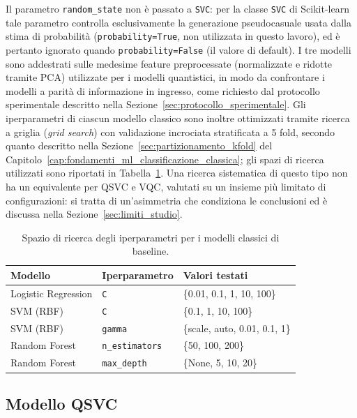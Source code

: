 

Il parametro \texttt{random\_state} non è passato a \texttt{SVC}: per la classe \texttt{SVC} di Scikit-learn tale parametro controlla esclusivamente la generazione pseudocasuale usata dalla stima di probabilità (\texttt{probability=True}, non utilizzata in questo lavoro), ed è pertanto ignorato quando \texttt{probability=False} (il valore di default). I tre modelli sono addestrati sulle medesime feature preprocessate (normalizzate e ridotte tramite PCA) utilizzate per i modelli quantistici, in modo da confrontare i modelli a parità di informazione in ingresso, come richiesto dal protocollo sperimentale descritto nella Sezione~\ref{sec:protocollo_sperimentale}. Gli iperparametri di ciascun modello classico sono inoltre ottimizzati tramite ricerca a griglia (\textit{grid search}) con validazione incrociata stratificata a 5 fold, secondo quanto descritto nella Sezione~\ref{sec:partizionamento_kfold} del Capitolo~\ref{cap:fondamenti_ml_classificazione_classica}; gli spazi di ricerca utilizzati sono riportati in Tabella~\ref{tab:grid_search_classici}. Una ricerca sistematica di questo tipo non ha un equivalente per QSVC e VQC, valutati su un insieme più limitato di configurazioni: si tratta di un'asimmetria che condiziona le conclusioni ed è discussa nella Sezione~\ref{sec:limiti_studio}.

\begin{table}[htbp]
\centering
\caption{Spazio di ricerca degli iperparametri per i modelli classici di baseline.}
\label{tab:grid_search_classici}
\begin{tabular}{lll}
\toprule
\textbf{Modello} & \textbf{Iperparametro} & \textbf{Valori testati} \\
\midrule
Logistic Regression & \texttt{C} & \{0.01, 0.1, 1, 10, 100\} \\
SVM (RBF) & \texttt{C} & \{0.1, 1, 10, 100\} \\
SVM (RBF) & \texttt{gamma} & \{scale, auto, 0.01, 0.1, 1\} \\
Random Forest & \texttt{n\_estimators} & \{50, 100, 200\} \\
Random Forest & \texttt{max\_depth} & \{None, 5, 10, 20\} \\
\bottomrule
\end{tabular}
\end{table}

\subsection{Modello QSVC}
\label{sec:impl_qsvc}

